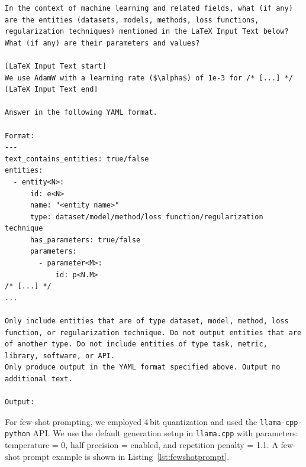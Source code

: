 \begin{lstlisting}[language=plain,caption=Zero-shot prompt example.,label=lst:promptexample,breaklines=true,captionpos=b,frame=single,showlines=true,basicstyle=\tiny\ttfamily]
In the context of machine learning and related fields, what (if any) are the entities (datasets, models, methods, loss functions, regularization techniques) mentioned in the LaTeX Input Text below? What (if any) are their parameters and values?

[LaTeX Input Text start]
We use AdamW with a learning rate ($\alpha$) of 1e-3 for /* [...] */
[LaTeX Input Text end]

Answer in the following YAML format.

Format:
---
text_contains_entities: true/false
entities:
  - entity<N>:
      id: e<N>
      name: "<entity name>"
      type: dataset/model/method/loss function/regularization technique
      has_parameters: true/false
      parameters:
        - parameter<M>:
            id: p<N.M>
/* [...] */
...

Only include entities that are of type dataset, model, method, loss function, or regularization technique. Do not output entities that are of another type. Do not include entities of type task, metric, library, software, or API.
Only produce output in the YAML format specified above. Output no additional text.

Output:
\end{lstlisting}

For few-shot prompting, we employed 4\,bit quantization and used the \texttt{llama-cpp-python} API. %
We use the default generation setup in \texttt{llama.cpp}
with parameters: temperature = 0, half precision = enabled, and repetition penalty = 1.1. A few-shot prompt example is shown in Listing~\ref{lst:fewshotprompt}.


